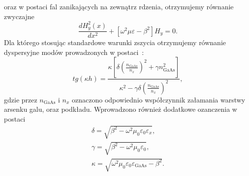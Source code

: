 oraz w postaci fal zanikających na zewnątrz rdzenia, otrzymujemy równanie zwyczajne
\begin{equation}
	\frac{d H_y^2(x)}{dx^2} + [ \omega^2 \mu \varepsilon - \beta^2 ] H_y = 0.
\end{equation}
Dla którego stosując standardowe warunki zszycia otrzymujemy równanie dyspersyjne modów prowadzonych w postaci~\cite{petykiewicz1989podstawy}:
\begin{equation}
tg( \kappa h)=\frac{\kappa [ \delta (\frac{n_{\textrm{GaAs}}}{n_x})^2 + \gamma n_{\textrm{GaAs}}^2 ]}{\kappa^2 - \gamma \delta (\frac{n_{\textrm{GaAs}}}{n_x })^2},
\label{eq:tm-disp}
\end{equation}
gdzie przez $n_{\textrm{GaAs}}$ i $n_x$ oznaczono odpowiednio współczynnik załamania warstwy arsenku galu, oraz podkładu. Wprowadzono również dodatkowe ozanczenia w postaci
\begin{equation}
	\begin{gathered}
		\delta=\sqrt{\beta^2-\omega^2 \mu_0 \varepsilon_0 \varepsilon_x},\\
		\gamma=\sqrt{\beta^2-\omega^2 \mu_0 \varepsilon_0},\\
		\kappa=\sqrt{\omega^2 \mu_0 \varepsilon_0 \varepsilon_{\textrm{GaAs}} - \beta^2}.
	\end{gathered}
\end{equation}

